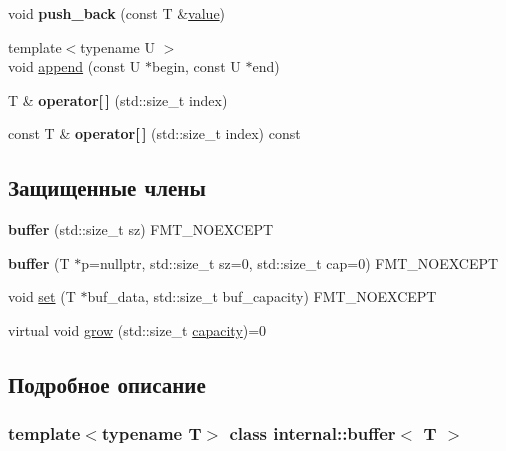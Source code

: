 \begin{DoxyCompactItemize}
void {\bfseries push\+\_\+back} (const T \&\hyperlink{classinternal_1_1value}{value})
\item 
{\footnotesize template$<$typename U $>$ }\\void \hyperlink{classinternal_1_1buffer_a0493c6d5ceedf88219624f59ea2fbf4c}{append} (const U $\ast$begin, const U $\ast$end)
\item 
\mbox{\label{classinternal_1_1buffer_a8414b0426cef668e72aabe1c05308e24}} 
T \& {\bfseries operator\mbox{[}$\,$\mbox{]}} (std\+::size\+\_\+t index)
\item 
\mbox{\label{classinternal_1_1buffer_a1cade6e84658d3a6439d340ce32f559c}} 
const T \& {\bfseries operator\mbox{[}$\,$\mbox{]}} (std\+::size\+\_\+t index) const
\end{DoxyCompactItemize}
\subsection*{Защищенные члены}
\begin{DoxyCompactItemize}
\item 
\mbox{\label{classinternal_1_1buffer_a7f46f907ef6294e5b498ab7f9efcabcc}} 
{\bfseries buffer} (std\+::size\+\_\+t sz) F\+M\+T\+\_\+\+N\+O\+E\+X\+C\+E\+PT
\item 
\mbox{\label{classinternal_1_1buffer_ad1409425bb50a33a6bde19e1eaae7192}} 
{\bfseries buffer} (T $\ast$p=nullptr, std\+::size\+\_\+t sz=0, std\+::size\+\_\+t cap=0) F\+M\+T\+\_\+\+N\+O\+E\+X\+C\+E\+PT
\item 
void \hyperlink{classinternal_1_1buffer_a0c5d6939cc27e8be6ae5e7bede1e3ae8}{set} (T $\ast$buf\+\_\+data, std\+::size\+\_\+t buf\+\_\+capacity) F\+M\+T\+\_\+\+N\+O\+E\+X\+C\+E\+PT
\item 
virtual void \hyperlink{classinternal_1_1buffer_a38f53be20945474be4f60b58b9b4cc54}{grow} (std\+::size\+\_\+t \hyperlink{classinternal_1_1buffer_ab71f52fc20af6ed2a15f75143c89e2a4}{capacity})=0
\end{DoxyCompactItemize}


\subsection{Подробное описание}
\subsubsection*{template$<$typename T$>$\newline
class internal\+::buffer$<$ T $>$}

